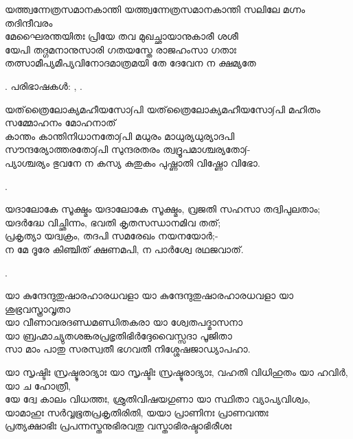 \begin{enumerate}

\begin{slokam}{\VSv}{\AD}{യത്ത്വന്നേത്രസമാനകാന്തി}
യത്ത്വന്നേത്രസമാനകാന്തി സലിലേ മഗ്നം തദിന്ദീവരം \\
മേഘൈരന്തയിതഃ പ്രിയേ തവ മുഖച്ഛായാനുകാരീ ശശീ \\
യേപി തദ്ഗമനാനുസാരി ഗതയസ്തേ രാജഹംസാ ഗതാഃ \\
തത്സാമീപ്യമീപ്യവിനോദമാത്രമയി തേ ദേവേന ന ക്ഷമ്യതേ
\end{slokam}


.  പരിഭാഷകൾ: , .


\begin{slokam}{\VSv}{\Melp}{യത്‌ത്രൈലോക്യമഹീയസോ∫പി}
യത്‌ത്രൈലോക്യമഹീയസോ∫പി മഹിതം സമ്മോഹനം മോഹനാത്‌\\
കാന്തം കാന്തിനിധാനതോ∫പി മധുരം മാധുര്യധുര്യാദപി\\
സൗന്ദര്യോത്തരതോ∫പി സുന്ദരതരം ത്വദ്രൂപമാശ്ചര്യതോ∫-\\
പ്യാശ്ചര്യം ഭുവനേ ന കസ്യ കുതുകം പുഷ്ണാതി വിഷ്ണോ വിഭോ.
\end{slokam}


. 

\begin{slokam}{\VSk}{\KD}{യദാലോകേ സൂക്ഷ്മം}
യദാലോകേ സൂക്ഷ്മം, വ്രജതി സഹസാ തദ്വിപുലതാം;\\
യദര്‍ദ്ധേ വിച്ഛിന്നം, ഭവതി കൃതസന്ധാനമിവ തത്‌;\\
പ്രകൃത്യാ യദ്വക്രം, തദപി സമരേഖം നയനയോര്‍;-\\
ന മേ ദൂരേ കിഞ്ചിത്‌ ക്ഷണമപി, ന പാര്‍ശ്വേ രഥജവാത്‌.
\end{slokam}



. 


\begin{slokam}{\VSv}{\Unk}{യാ കുന്ദേന്ദുതുഷാരഹാരധവളാ}
യാ കുന്ദേന്ദുതുഷാരഹാരധവളാ യാ ശുഭ്രവസ്ത്രാവൃതാ\\
യാ വീണാവരദണ്ഡമണ്ഡിതകരാ യാ ശ്വേതപദ്മാസനാ\\
യാ ബ്രഹ്മാച്യുതശങ്കരപ്രഭൃതിഭിർദ്ദേവൈസ്സദാ പൂജിതാ\\
സാ മാം പാതു സരസ്വതീ ഭഗവതീ നിശ്ശേഷജാഡ്യാപഹാ.
\end{slokam}


\begin{slokam}{\VSr}{\KD}{യാ സൃഷ്ടിഃ സ്രഷ്ടുരാദ്യാഃ}
യാ സൃഷ്ടിഃ സ്രഷ്ടുരാദ്യാഃ, വഹതി വിധിഹുതം യാ ഹവിര്‍, യാ ച ഹോത്രീ,\\
യേ ദ്വേ കാലം വിധത്തഃ, ശ്രുതിവിഷയഗുണാ യാ സ്ഥിതാ വ്യാപ്യവിശ്വം,\\
യാമാഹുഃ സര്‍വ്വഭൂതപ്രകൃതിരിതി, യയാ പ്രാണിനഃ പ്രാണവന്തഃ\\
പ്രത്യക്ഷാഭിഃ പ്രപന്നസ്തനുഭിരവതു വസ്താഭിരഷ്ടാഭിരീശഃ
\end{slokam}


\end{enumerate}
